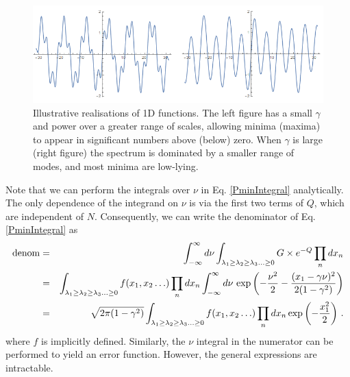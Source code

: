 \documentclass[12pt]{article}
\newcommand{\SH}[1]{\textcolor{brown}{[{\bf SH}: #1]}}
\begin{document}
\begin{figure}
  \centering
    \includegraphics[width=\linewidth]{TwoSigmas.png}
  \caption{Illustrative realisations of 1D functions. The left figure has a small $\gamma$ and power over a greater range of scales, allowing minima (maxima) to appear in significant numbers above (below) zero. When $\gamma$ is large (right figure) the spectrum is dominated by a smaller range of modes, and most minima are low-lying.}
  \label{examples1}
\end{figure}

Note that we can perform the integrals over $\nu$ in Eq. \ref{PminIntegral} analytically. The only dependence of the integrand on $\nu$ is via the first two terms of $Q$, which are independent of $N$. Consequently, we can write the denominator of Eq. \ref{PminIntegral} as 
%
\begin{eqnarray}
\nonumber {\rm denom} &=&
\int^\infty_{-\infty} d\nu \int_{\lambda_1 \geq \lambda_2 \geq \lambda_3 \ldots \geq 0} G \times e^{-Q} \prod_n dx_n \\ 
\nonumber &=&  \int_{\lambda_1 \geq \lambda_2 \geq \lambda_3 \ldots \geq 0} f(x_1, x_2 \ldots) \prod_n dx_n \int^\infty_{-\infty} d\nu \,\exp\left(-\frac{\nu^2}{2}- \frac{(x_1- \gamma \nu)^2}{2(1-\gamma^2)}\right)\\
&=& \sqrt{2\pi (1-\gamma^2)}  \int_{\lambda_1 \geq \lambda_2 \geq \lambda_3 \ldots \geq 0} f(x_1, x_2 \ldots) \prod_n dx_n\exp\left(-\frac{x_1^2}{2}\right) \, .
\end{eqnarray}
% 
where $f$ is implicitly defined.  Similarly, the $\nu$ integral in the numerator can be performed to yield an error function. However, the general expressions are intractable. 
%
\end{document}
